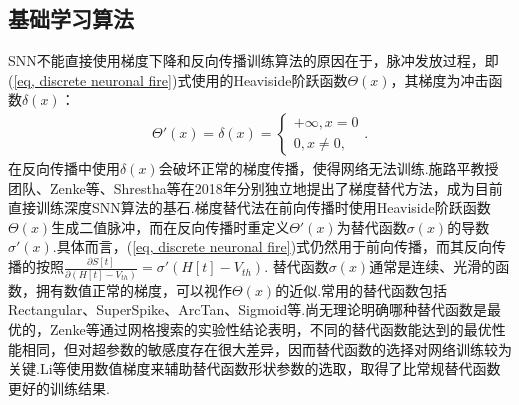 \documentclass{SCIS2020cn}
\begin{document}
\subsection{基础学习算法}%
SNN不能直接使用梯度下降和反向传播训练算法的原因在于，脉冲发放过程，即(\ref{eq, discrete neuronal fire})式使用的Heaviside阶跃函数$\Theta(x)$，其梯度为冲击函数$\delta(x)$：
\begin{align}
\Theta'(x) = \delta(x) = \begin{cases}
    +\infty, x = 0\\
    0, x \ne 0,
\end{cases}.
\end{align}
在反向传播中使用$\delta(x)$会破坏正常的梯度传播，使得网络无法训练.施路平教授团队\cite{wu2018STBP}、Zenke等\cite{10.1162/neco_a_01086}、Shrestha等\cite{shrestha2018slayer}在2018年分别独立地提出了梯度替代方法，成为目前直接训练深度SNN算法的基石.梯度替代法在前向传播时使用Heaviside阶跃函数$\Theta(x)$生成二值脉冲，而在反向传播时重定义$\Theta'(x)$为替代函数$\sigma(x)$的导数$\sigma'(x)$.具体而言，(\ref{eq, discrete neuronal fire})式仍然用于前向传播，而其反向传播的按照$\frac{\partial S[t]}{\partial (H[t] - V_{th})} = \sigma'(H[t] - V_{th})$.
替代函数$\sigma(x)$通常是连续、光滑的函数，拥有数值正常的梯度，可以视作$\Theta(x)$的近似.常用的替代函数包括Rectangular\cite{wu2018STBP}、SuperSpike\cite{10.1162/neco_a_01086}、ArcTan\cite{fang2021incorporating}、Sigmoid等.尚无理论明确哪种替代函数是最优的，Zenke等\cite{Zenke2020.06.29.176925}通过网格搜索的实验性结论表明，不同的替代函数能达到的最优性能相同，但对超参数的敏感度存在很大差异，因而替代函数的选择对网络训练较为关键.Li等\cite{li2021differentiable}使用数值梯度来辅助替代函数形状参数的选取，取得了比常规替代函数更好的训练结果.
\end{document}
